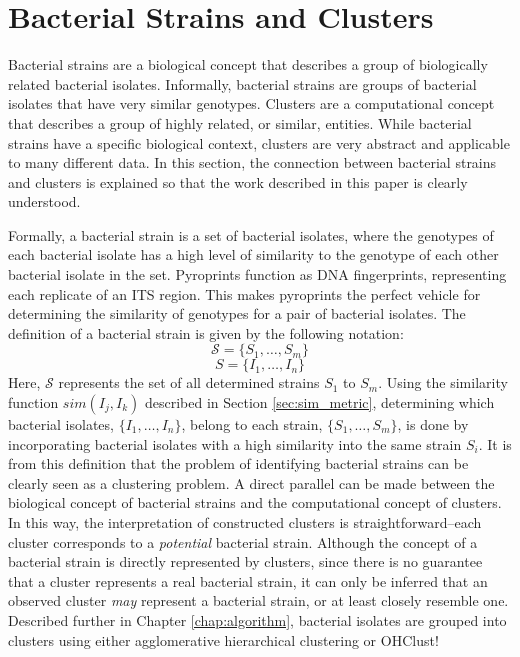 \documentclass[12pt]{ucthesis}
\begin{document}
   \section{Bacterial Strains and Clusters}\label{sec:strains}
      Bacterial strains are a biological concept that describes a group of
      biologically related bacterial isolates. Informally, bacterial strains
      are groups of bacterial isolates that have very similar genotypes.
      Clusters are a computational concept that describes a group of highly
      related, or similar, entities. While bacterial strains have a specific
      biological context, clusters are very abstract and applicable to many
      different data. In this section, the connection between bacterial strains
      and clusters is explained so that the work described in this paper is
      clearly understood.

      Formally, a bacterial strain is a set of bacterial isolates, where the
      genotypes of each bacterial isolate has a high level of similarity to the
      genotype of each other bacterial isolate in the set. Pyroprints function
      as DNA fingerprints, representing each replicate of an ITS region. This
      makes pyroprints the perfect vehicle for determining the similarity of
      genotypes for a pair of bacterial isolates. The definition of a
      bacterial strain is given by the following notation:
      $$\mathcal{S} = \{S_1, \ldots, S_m\}$$
      $$S = \{I_1, \ldots, I_n\}$$
      Here, $\mathcal{S}$ represents the set of all determined strains $S_1$ to
      $S_m$. Using the similarity function $sim(I_j, I_k)$ described in Section
      \ref{sec:sim_metric}, determining which bacterial isolates, $\{I_1,
      \ldots, I_n\}$, belong to each strain, $\{S_1, \ldots, S_m\}$, is done by
      incorporating bacterial isolates with a high similarity into the same
      strain $S_i$. It is from this definition that the problem of identifying
      bacterial strains can be clearly seen as a clustering problem. A direct
      parallel can be made between the biological concept of bacterial strains
      and the computational concept of clusters. In this way, the
      interpretation of constructed clusters is straightforward--each cluster
      corresponds to a \textit{potential} bacterial strain. Although the
      concept of a bacterial strain is directly represented by clusters, since
      there is no guarantee that a cluster represents a real bacterial strain,
      it can only be inferred that an observed cluster \textit{may} represent a
      bacterial strain, or at least closely resemble one. Described further in
      Chapter \ref{chap:algorithm}, bacterial isolates are grouped into
      clusters using either agglomerative hierarchical clustering or
      \textsf{OHClust!}
\end{document}
